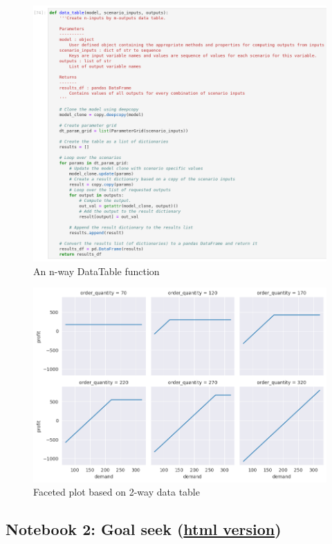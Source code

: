 \documentclass[ited]{informs3}                      %
\begin{document}
\begin{figure}[!htbp]
	\centering
	\includegraphics[scale=0.5]{images/oo_datatable_function}
	\caption{An n-way DataTable function}
	\label{fig:oo_datatable_function}
\end{figure}



\begin{figure}[!htbp]
\centering
\includegraphics[width=1.0\textwidth]{images/two_way_dt}
\caption{Faceted plot based on 2-way data table}
\label{fig:2way_dt}
\end{figure}


\subsection{Notebook 2: Goal seek (\href{http://www.sba.oakland.edu/faculty/isken/excel_with_python/what_if_2_goalseek.html}{html version})}
\end{document}
